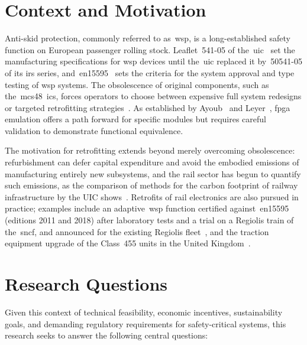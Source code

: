 \section{Context and Motivation}
\label{sec:context}

Anti-skid protection, commonly referred to as~\gls{wsp}, is a long-established safety function on European passenger rolling stock. Leaflet~\mbox{541-05} of the~\gls{uic}~\cite{uic541_05_2016} set the manufacturing specifications for \gls{wsp} devices until the~\gls{uic} replaced it by~\mbox{50541-05} of its \gls{irs} series, and~\gls{en15595}~\cite{en15595_2018} sets the criteria for the system approval and type testing of \gls{wsp} systems. The obsolescence of original components, such as the~\gls{mcs48}~\glspl{ic}, forces operators to choose between expensive full system redesigns or targeted retrofitting strategies~\cite{guzman2011obsolescence}. As established by Ayoub~\cite{ayoub2014} and Leyer~\cite{leyer2023}, \gls{fpga} emulation offers a path forward for specific modules but requires careful validation to demonstrate functional equivalence.

The motivation for retrofitting extends beyond merely overcoming obsolescence: refurbishment can defer capital expenditure and avoid the embodied emissions of manufacturing entirely new subsystems, and the rail sector has begun to quantify such emissions, as the comparison of methods for the carbon footprint of railway infrastructure by the UIC shows~\cite{carbon_infra_uic_2016}. Retrofits of rail electronics are also pursued in practice; examples include an adaptive~\gls{wsp} function certified against~\gls{en15595} (editions 2011 and 2018) after laboratory tests and a trial on a Regiolis train of the~\gls{sncf}, and announced for the existing Regiolis fleet~\cite{wabtec_wsp_cert_2022}, and the traction equipment upgrade of the Class~455 units in the United Kingdom~\cite{rg_class455_upgrade_2013}.

\section{Research Questions}
\label{sec:research_questions}

Given this context of technical feasibility, economic incentives, sustainability goals, and demanding regulatory requirements for safety-critical systems, this research seeks to answer the following central questions:

